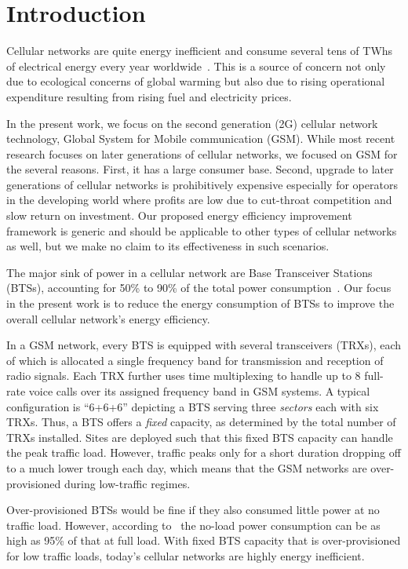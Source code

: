 \section{Introduction}
\label{sec:intro} 
Cellular networks are quite energy inefficient and consume several tens of TWhs of electrical energy
every year worldwide~\cite{Oh:Comm:2011}. This is a source of concern not only due to ecological concerns of global warming but also due to rising operational expenditure resulting from rising fuel and electricity prices. 

In the present work, we focus on the second generation (2G) cellular network technology, Global System for Mobile communication (GSM). While most recent research focuses on later generations of cellular networks, we focused on GSM for the several reasons. First, it has a large consumer base. Second, upgrade to later generations of cellular networks is prohibitively expensive especially for operators in the developing world where profits are low due to cut-throat competition and slow return on investment. Our proposed energy efficiency improvement framework is generic and should be applicable to other types of cellular networks as well, but we make no claim to its effectiveness in such scenarios. 

The major sink of power in a cellular network are Base
Transceiver Stations (BTSs), accounting for 50\% to 90\% of
the total power
consumption~\cite{Louhi:2007:BTSPower:INTELEC,Oh:Comm:2011}. Our focus in the present work is to reduce the energy consumption of BTSs to improve the overall cellular network's energy efficiency.

In a GSM network, every BTS is equipped with several transceivers (TRXs), each of
which is allocated a single frequency band for transmission and
reception of radio signals. Each TRX further uses time
multiplexing to handle up to 8 full-rate voice calls over its
assigned frequency band in GSM systems. A typical configuration
is ``6+6+6'' depicting a BTS serving three \textit{sectors}
each with six TRXs. Thus, a BTS offers a \textit{fixed} capacity, as
determined by the total number of TRXs installed. Sites are
deployed such that this fixed BTS capacity can handle the peak
traffic load. However, traffic peaks only for a short duration
dropping off to a much lower trough each day, which means that
the GSM networks are over-provisioned during
low-traffic regimes.

Over-provisioned BTSs would be fine if they also
consumed little power at no traffic
load. However, according to~\cite{Peng:2011:BTSSaving:Mobicom}
the no-load power consumption can be as high as 95\% of that at
full load. With fixed BTS capacity that is over-provisioned for
low traffic loads, today's cellular networks are highly energy inefficient.

